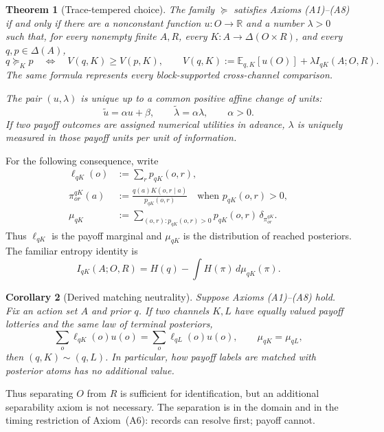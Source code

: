 \documentclass[11pt,a4paper]{article}
\newtheorem{theorem}{Theorem}
\newtheorem{corollary}[theorem]{Corollary}
\theoremstyle{definition}
\newcommand{\D}{\Delta}
\newcommand{\E}{\mathbb E}
\newcommand{\I}{I}
\newcommand{\Sh}{H}
\newcommand{\1}{\mathbf 1}
\begin{document}
\begin{theorem}[Trace-tempered choice]\label{thm:main}
The family $\boldsymbol{\succeq}$ satisfies Axioms \textup{(A1)--(A8)} if and only if there are a nonconstant function
$u:O\to\mathbb R$ and a number $\lambda>0$ such that, for every nonempty finite $A,R$, every
$K:A\to\D(O\times R)$, and every $q,p\in\D(A)$,
\begin{equation}
 q\succeq_Kp
 \quad\Longleftrightarrow\quad
 V(q,K)\ge V(p,K),
 \qquad
 V(q,K):=\E_{q,K}[u(O)]+\lambda\I_{qK}(A;O,R).
 \label{eq:representation}
\end{equation}
The same formula represents every block-supported cross-channel comparison.

The pair $(u,\lambda)$ is unique up to a common positive affine change of units:
\[
 \widetilde u=\alpha u+\beta,\qquad
 \widetilde\lambda=\alpha\lambda,\qquad \alpha>0.
\]
If two payoff outcomes are assigned numerical utilities in advance, $\lambda$ is uniquely measured in those payoff
units per unit of information.
\end{theorem}

For the following consequence, write
\begin{align*}
 \ell_{qK}(o)&:=\sum_r p_{qK}(o,r),\\
 \pi^{qK}_{or}(a)&:=\frac{q(a)K(o,r\mid a)}{p_{qK}(o,r)}
 \quad\text{when }p_{qK}(o,r)>0,\\
 \mu_{qK}&:=\sum_{(o,r):p_{qK}(o,r)>0}
 p_{qK}(o,r)\,\delta_{\pi^{qK}_{or}}.
\end{align*}
Thus $\ell_{qK}$ is the payoff marginal and $\mu_{qK}$ is the distribution of reached posteriors.  The familiar
entropy identity is
\[
 \I_{qK}(A;O,R)=\Sh(q)-\int\Sh(\pi)\,d\mu_{qK}(\pi).
\]

\begin{corollary}[Derived matching neutrality]\label{cor:matching}
Suppose Axioms \textup{(A1)--(A8)} hold.  Fix an action set $A$ and prior $q$.  If two channels $K,L$ have equally
valued payoff lotteries and the same law of terminal posteriors,
\[
 \sum_o\ell_{qK}(o)u(o)=\sum_o\ell_{qL}(o)u(o),
 \qquad
 \mu_{qK}=\mu_{qL},
\]
then $(q,K)\sim(q,L)$.  In particular, how payoff labels are matched with posterior atoms has no additional value.
\end{corollary}

Thus separating $O$ from $R$ is sufficient for identification, but an additional separability axiom is not necessary.
The separation is in the domain and in the timing restriction of Axiom~\textup{(A6)}: records can resolve first; payoff
cannot.
\end{document}
